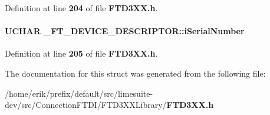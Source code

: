 Definition at line {\bf 204} of file {\bf F\+T\+D3\+X\+X.\+h}.

\paragraph[{i\+Serial\+Number}]{\setlength{\rightskip}{0pt plus 5cm}U\+C\+H\+AR \+\_\+\+F\+T\+\_\+\+D\+E\+V\+I\+C\+E\+\_\+\+D\+E\+S\+C\+R\+I\+P\+T\+O\+R\+::i\+Serial\+Number}\label{struct__FT__DEVICE__DESCRIPTOR_a98de1646c2f09c2947ecc8fab3b2b17a}


Definition at line {\bf 205} of file {\bf F\+T\+D3\+X\+X.\+h}.



The documentation for this struct was generated from the following file\+:\begin{DoxyCompactItemize}
\item 
/home/erik/prefix/default/src/limesuite-\/dev/src/\+Connection\+F\+T\+D\+I/\+F\+T\+D3\+X\+X\+Library/{\bf F\+T\+D3\+X\+X.\+h}\end{DoxyCompactItemize}
